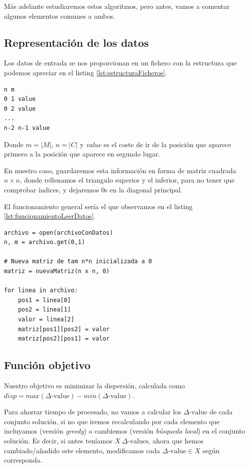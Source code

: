 Más adelante estudiaremos estos algoritmos, pero antes, vamos a comentar algunos elementos comunes a ambos.

\subsection{Representación de los datos}

Los datos de entrada se nos proporcionan en un fichero con la estructura que podemos apreciar en el listing \ref{lst:estructuraFicheros}.

\begin{lstlisting}[frame=single,caption={Estructura de los ficheros proporcionados},label=lst:estructuraFicheros, captionpos=b]
n m
0 1 value
0 2 value
...
n-2 n-1 value
\end{lstlisting}

Donde $m = |M|$, $n = |C|$ y \textit{value} es el coste de ir de la posición que aparece primero a la posición que aparece en segundo lugar.

En nuestro caso, guardaremos esta información en forma de matriz cuadrada $n \times n$, donde rellenamos el triangulo superior y el inferior, para no tener que comprobar índices, y dejaremos 0s en la diagonal principal.

El funcionamiento general sería el que observamos en el listing \ref{lst:funcionamientoLeerDatos}.

\begin{lstlisting}[frame=single, caption={Generalización de la lectura de los datos},label=lst:funcionamientoLeerDatos, captionpos=b]
archivo = open(archivoConDatos)
n, m = archivo.get(0,1)

# Nueva matriz de tam n*n inicializada a 0
matriz = nuevaMatriz(n x n, 0)

for linea in archivo:
    pos1 = linea[0]
    pos2 = linea[1]
    valor = linea[2]
    matriz[pos1][pos2] = valor
    matriz[pos2][pos1] = valor
\end{lstlisting}


\subsection{Función objetivo}

Nuestro objetivo es minimizar la dispersión, calculada como $disp = max(\Delta\text{-value})-min(\Delta\text{-value})$.

Para ahorrar tiempo de procesado, no vamos a calcular los $\Delta\text{-value}$ de cada conjunto solución, si no que iremos recalculando por cada elemento que incluyamos (versión \textit{greedy}) o cambiemos (versión \textit{búsqueda local}) en el conjunto solución.
Es decir, si antes teníamos $X \ \Delta\text{-values}$, ahora que hemos cambiado/añadido este elemento, modificamos cada $\Delta\text{-value} \in X$ según corresponda.

